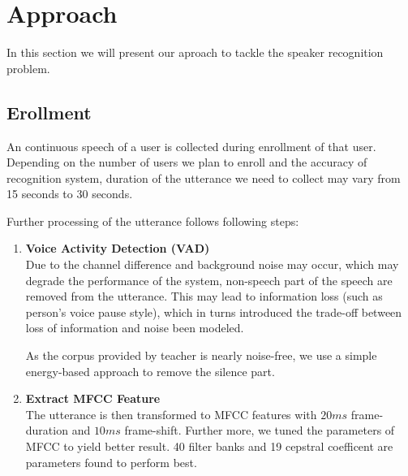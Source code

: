 \section{Approach}
	In this section we will present our aproach to tackle the speaker recognition problem.
\subsection{Erollment}
	\label{sec:approach_enrollment}
	An continuous speech of a user is collected during enrollment of that user. Depending on
	the number of users we plan to enroll and the accuracy of recognition system, duration
	of the utterance we need to collect may vary from 15 seconds to 30 seconds.

	Further processing of the utterance follows following steps:
	\begin{enumerate}
		\item \textbf{Voice Activity Detection (VAD)} \\
			Due to the channel difference and background noise may occur, which
			may degrade the performance of the system, non-speech part of the
			speech are removed from the utterance. This may lead to
			information loss (such as person's voice pause style), which in
			turns introduced the trade-off between loss of information and
			noise been modeled.

			As the corpus provided by teacher is nearly noise-free, we use a
			simple energy-based approach to remove the silence part.

		\item \textbf{Extract MFCC Feature } \\
			The utterance is then transformed to MFCC features with $20ms$
			frame-duration and $10ms$ frame-shift. Further more, we tuned the
			parameters of MFCC to yield better result. 40 filter banks and 19
			cepstral coefficent are parameters found to perform best.


\end{enumerate}
